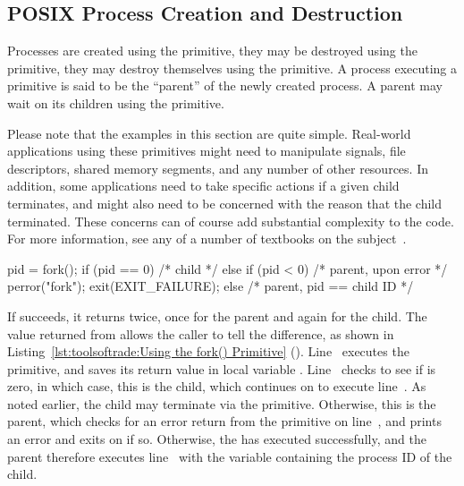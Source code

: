 \subsection{POSIX Process Creation and Destruction}
\label{sec:toolsoftrade:POSIX Process Creation and Destruction}

Processes are created using the  primitive, they may
be destroyed using the  primitive, they may destroy
themselves using the  primitive.
A process executing a  primitive is said to be the ``parent''
of the newly created process.
A parent may wait on its children using the  primitive.

Please note that the examples in this section are quite simple.
Real-world applications using these primitives might need to manipulate
signals, file descriptors, shared memory segments, and any number of
other resources.
In addition, some applications need to take specific actions if a given
child terminates, and might also need to be concerned with the reason
that the child terminated.
These concerns can of course add substantial complexity to the code.
For more information, see any of a number of textbooks on the
subject~\cite{WRichardStevens1992,StewartWeiss2013UNIX}.

\begin{listing}[tbp]
\begin{fcvlabel}
\begin{VerbatimL}[commandchars=\%\[\]]
pid = fork();%
if (pid == 0) {%
	/* child */%
} else if (pid < 0) {%
	/* parent, upon error */%
	perror("fork");
	exit(EXIT_FAILURE);%
} else {
	/* parent, pid == child ID */%
}
\end{VerbatimL}
\end{fcvlabel}
\caption{Using the  Primitive}
\label{lst:toolsoftrade:Using the fork() Primitive}
\end{listing}

\begin{fcvref}
If  succeeds, it returns twice, once for the parent
and again for the child.
The value returned from  allows the caller to tell
the difference, as shown in
Listing~\ref{lst:toolsoftrade:Using the fork() Primitive}
().
Line~ executes the  primitive, and saves
its return value in local variable .
Line~ checks to see if  is zero, in which case,
this is the child, which continues on to execute line~.
As noted earlier, the child may terminate via the  primitive.
Otherwise, this is the parent, which checks for an error return from
the  primitive on line~, and prints an error
and exits on  if so.
Otherwise, the  has executed successfully, and the parent
therefore executes line~ with the variable 
containing the process ID of the child.
\end{fcvref}

